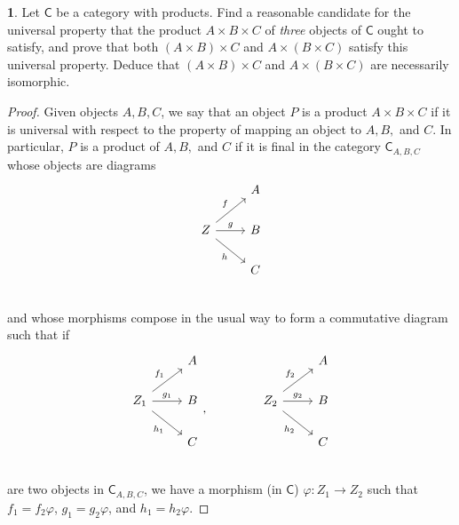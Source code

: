 \documentclass{article}
\theoremstyle{definition}
\newtheorem{ex}{}[section]
\begin{document}
\begin{ex}
	Let $\mathsf{C}$ be a category with products.
	Find a reasonable candidate for the universal property that the product $A \times B \times C$ of \textit{three} objects of $\mathsf{C}$ ought to satisfy, and prove that both $(A \times B) \times C$ and $A \times (B \times C)$ satisfy this universal property.
	Deduce that $(A \times B) \times C$ and $A \times (B \times C)$ are necessarily isomorphic.
\end{ex}
\begin{proof}
	Given objects $A, B, C$, we say that an object $P$ is a product $A \times B \times C$ if it is universal with respect to the property of mapping an object to $A, B,$ and $C$.
	In particular, $P$ is a product of $A, B,$ and $C$ if it is final in the category $\mathsf{C}_{A,B,C}$ whose objects are diagrams \begin{equation*}
		\begin{tikzcd}
			& A \\
			Z \arrow[ur, "f"] \arrow[r, "g"] \arrow[dr, "h"'] & B \\
			& C \\
		\end{tikzcd}
	\end{equation*}
	and whose morphisms compose in the usual way to form a commutative diagram such that if \begin{equation*}
		\begin{tikzcd}
			& A \\
			Z_1 \arrow[ur, "f_1"] \arrow[r, "g_1"] \arrow[dr, "h_1"'] & B \\
			& C \\
		\end{tikzcd},\hspace{4em}
		\begin{tikzcd}
			& A \\
			Z_2 \arrow[ur, "f_2"] \arrow[r, "g_2"] \arrow[dr, "h_2"'] & B \\
			& C \\
		\end{tikzcd}
	\end{equation*} are two objects in $\mathsf{C}_{A,B,C}$, we have a morphism (in $\mathsf{C}$) $\varphi : Z_1 \to Z_2$ such that $f_1 = f_2\varphi$, $g_1 = g_2\varphi$, and $h_1 = h_2\varphi$.


\end{proof}
\end{document}
